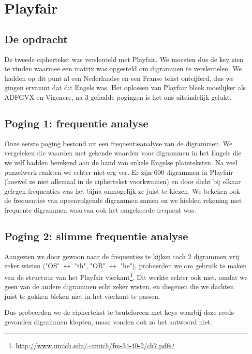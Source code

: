 
\section{Playfair}
\subsection{De opdracht}
De tweede ciphertekst was versleuteld met Playfair. We moesten dus de key zien te vinden waarmee een matrix was opgesteld om digrammen te versleutelen. We hadden op dit punt al een Nederlandse en een Franse tekst ontcijferd, dus we gingen ervanuit dat dit Engels was. 
Het oplossen van Playfair bleek moeilijker als ADFGVX en Vigenere, na 3 gefaalde pogingen is het ons uiteindelijk gelukt.

\subsection{Poging 1: frequentie analyse}
Onze eerste poging bestond uit een frequentieanalyse van de digrammen. We vergeleken die waarden met gekende waarden voor digrammen in het Engels die we zelf hadden berekend aan de hand van enkele Engelse plainteksten. Na veel puzzelwerk raakten we echter niet erg ver. Er zijn 600 digrammen in Playfair (hoewel ze niet allemaal in de ciphertekst voorkwamen) en door dicht bij elkaar gelegen frequenties was het bijna onmogelijk ze juist te kiezen. We bekeken ook de frequenties van opeenvolgende digrammen samen en we hielden rekening met frequente digrammen waarvan ook het omgekeerde frequent was.

\subsection{Poging 2: slimme frequentie analyse}
Aangezien we door gewoon naar de frequenties te kijken toch 2 digrammen vrij zeker wisten ("OS" $\leftrightarrow$ "th", "OB" $\leftrightarrow$ "he"), probeerden we om gebruik te maken van de structuur van het Playfair vierkant\footnote{\url{http://www.umich.edu/~umich/fm-34-40-2/ch7.pdf}}. Dit werkte echter ook niet, omdat we geen van de andere digrammen echt zeker wisten, en diegenen die we dachten juist te gokken bleken niet in het vierkant te passen.

Dus probeerden we de ciphertekst te bruteforcen met keys waarbij deze reeds gevonden digrammen klopten, maar vonden ook zo het antwoord niet.
 

